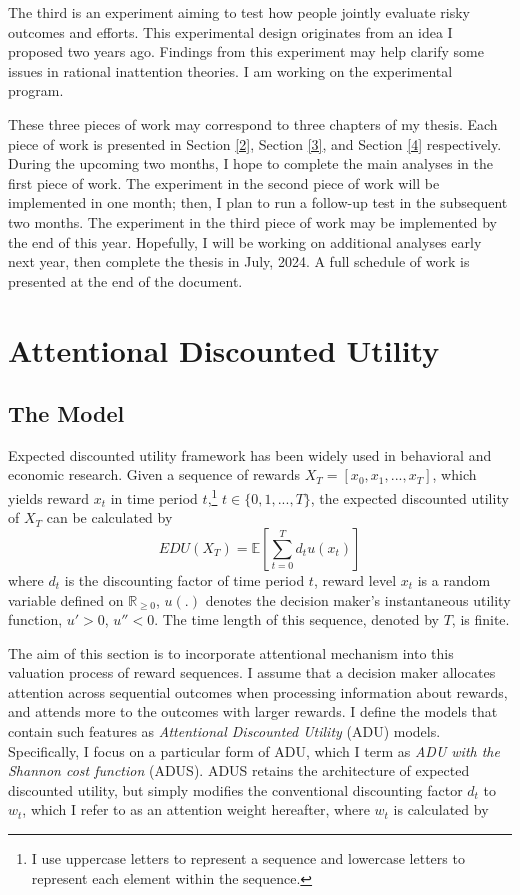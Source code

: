 \documentclass[
  12pt,
]{article}
\begin{document}
The third is an experiment aiming to test how people jointly evaluate
risky outcomes and efforts. This experimental design originates from an
idea I proposed two years ago. Findings from this experiment may help
clarify some issues in rational inattention theories. I am working on
the experimental program.

These three pieces of work may correspond to three chapters of my
thesis. Each piece of work is presented in Section \ref{2}, Section
\ref{3}, and Section \ref{4} respectively. During the upcoming two
months, I hope to complete the main analyses in the first piece of work.
The experiment in the second piece of work will be implemented in one
month; then, I plan to run a follow-up test in the subsequent two
months. The experiment in the third piece of work may be implemented by
the end of this year. Hopefully, I will be working on additional
analyses early next year, then complete the thesis in July, 2024. A full
schedule of work is presented at the end of the document.

\hypertarget{attentional-discounted-utility}{%
\section{\texorpdfstring{Attentional Discounted Utility
\label{2}}{Attentional Discounted Utility }}\label{attentional-discounted-utility}}

\hypertarget{the-model}{%
\subsection{The Model}\label{the-model}}

Expected discounted utility framework has been widely used in behavioral
and economic research. Given a sequence of rewards
\(X_T=[x_0,x_1,...,x_T]\), which yields reward \(x_t\) in time period
\(t\),\footnote{I use uppercase letters to represent a sequence and
  lowercase letters to represent each element within the sequence.}
\(t \in \{0,1,...,T\}\), the expected discounted utility of \(X_T\) can
be calculated by\[
EDU(X_T)= \mathbb{E}\left[\sum_{t=0}^T d_t u(x_t)\right]
\]where \(d_t\) is the discounting factor of time period \(t\), reward
level \(x_t\) is a random variable defined on \(\mathbb{R}_{\geq 0}\),
\(u(.)\) denotes the decision maker's instantaneous utility function,
\(u'>0\), \(u''<0\). The time length of this sequence, denoted by \(T\),
is finite.

The aim of this section is to incorporate attentional mechanism into
this valuation process of reward sequences. I assume that a decision
maker allocates attention across sequential outcomes when processing
information about rewards, and attends more to the outcomes with larger
rewards. I define the models that contain such features as
\emph{Attentional Discounted Utility} (ADU) models. Specifically, I
focus on a particular form of ADU, which I term as \emph{ADU with the
Shannon cost function} (ADUS). ADUS retains the architecture of expected
discounted utility, but simply modifies the conventional discounting
factor \(d_t\) to \(w_t\), which I refer to as an attention weight
hereafter, where \(w_t\) is calculated by
\end{document}
